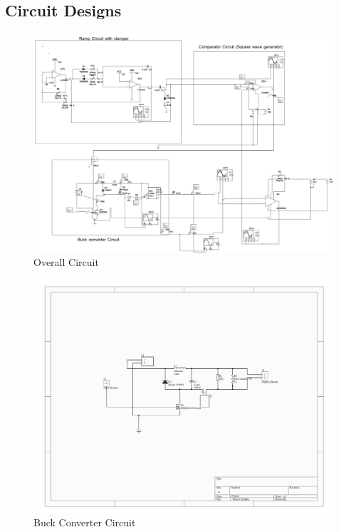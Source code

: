 \documentclass[a4paper,12pt]{article}
\begin{document}
\subsection{Circuit Designs}
\begin{figure}[h]
    \centering
    \includegraphics[angle=270,origin=c,scale=0.337]{Fig_04-1.jpg}
    \caption{Overall Circuit}
    \label{fig:Overall Circuit}
\end{figure}
\newpage
\begin{figure}[H]
    \centering
    \includegraphics[angle=270,origin=c,scale=0.27]{Fig_05-1.jpg}
    \caption{Buck Converter Circuit}
    \label{fig:Buck Converter Circuit}
\end{figure}
\end{document}
